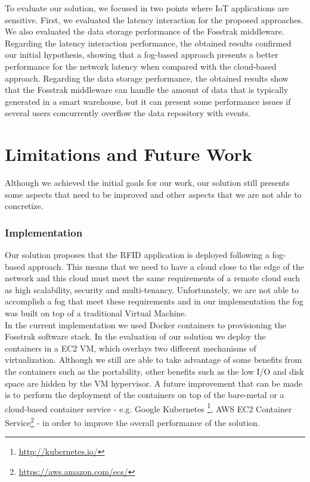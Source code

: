 To evaluate our solution, we focused in two points where \gls{IoT} applications are sensitive. First,
we evaluated the latency interaction for the proposed approaches. We also evaluated the data storage
performance of the Fosstrak middleware. Regarding the latency interaction performance, the obtained
results confirmed our initial hypothesis, showing that a fog-based approach presents a better
performance for the network latency when compared with the cloud-based approach. Regarding the data
storage performance, the obtained results show that the Fosstrak middleware can handle the amount
of data that is typically generated in a smart warehouse, but it can present some performance issues
if several users concurrently overflow the data repository with events.

\section{Limitations and Future Work}
\label{sec:limitations_and_future_work}
Although we achieved the initial goals for our work, our solution still presents some aspects that
need to be improved and other aspects that we are not able to concretize.

\subsubsection{Implementation}
\label{subs:conclusion_impl}
Our solution proposes that the \gls{RFID} application is deployed following a fog-based approach.
This means that we need to have a cloud close to the edge of the network and this cloud must meet
the same requirements of a remote cloud such as high scalability, security and multi-tenancy.
Unfortunately, we are not able to accomplish a fog that meet these requirements and in our implementation
the fog was built on top of a traditional Virtual Machine.\\

In the current implementation we used Docker containers to provisioning the Fosstrak software stack.
In the evaluation of our solution we deploy the containers in a \gls{EC2} \gls{VM}, which overlays two
different mechanisms of virtualization. Although we still are able to take advantage of some benefits
from the containers such as the portability, other benefits such as the low I/O and disk space are
hidden by the \gls{VM} hypervisor. A future improvement that can be made is to perform the deployment
of the containers on top of the bare-metal or a cloud-based container service - e.g. Google Kubernetes
\footnote{\url{http://kubernetes.io/}}, \gls{AWS} \gls{EC2} Container Service\footnote{\url{https://aws.amazon.com/ecs/}} -
in order to improve the overall performance of the solution.

